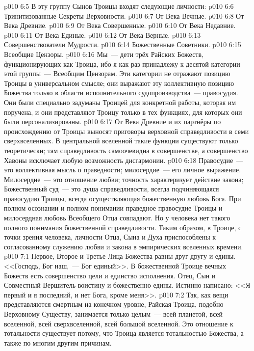\vs p010 6:5 \pc В эту группу Сынов Троицы входят следующие личности:
\vs p010 6:6 Тринитизованные Секреты Верховности.
\vs p010 6:7 От Века Вечные.
\vs p010 6:8 От Века Древние.
\vs p010 6:9 От Века Совершенные.
\vs p010 6:10 От Века Недавние.
\vs p010 6:11 От Века Единые.
\vs p010 6:12 От Века Верные.
\vs p010 6:13 Совершенствователи Мудрости.
\vs p010 6:14 Божественные Советники.
\vs p010 6:15 Всеобщие Цензоры.
\vs p010 6:16 \pc Мы~--- дети трёх Райских Божеств, функционирующих как Троица, ибо я как раз принадлежу к десятой категории этой группы~--- Всеобщим Цензорам. Эти категории не отражают позицию Троицы в универсальном смысле; они выражают эту коллективную позицию Божества только в области исполнительного судопроизводства~--- правосудия. Они были специально задуманы Троицей для конкретной работы, которая им поручена, и они представляют Троицу только в тех функциях, для которых они были персонализированы.
\vs p010 6:17 От Века Древние и их партнёры по происхождению от Троицы выносят приговоры верховной справедливости в семи сверхвселенных. В центральной вселенной такие функции существуют только теоретически; там справедливость самоочевидна в совершенстве, а совершенство Хавоны исключает любую возможность дисгармонии.
\vs p010 6:18 Правосудие~--- это коллективная мысль о праведности; милосердие~--- его личное выражение. Милосердие~--- это отношение любви; точность характеризует действие закона; Божественный суд~--- это душа справедливости, всегда подчиняющаяся правосудию Троицы, всегда осуществляющая божественную любовь Бога. При полном осознании и полном понимании праведное правосудие Троицы и милосердная любовь Всеобщего Отца совпадают. Но у человека нет такого полного понимания божественной справедливости. Таким образом, в Троице, с точки зрения человека, личности Отца, Сына и Духа приспособлены к согласованному служению любви и закона в эмпирических вселенных времени.
\vs p010 7:1 Первое, Второе и Третье Лица Божества равны друг другу и едины. <<Господь, Бог наш,~--- Бог единый>>. В божественной Троице вечных Божеств есть совершенство цели и единство исполнения. Отец, Сын и Совместный Вершитель воистину и божественно едины. Истинно написано: <<Я первый и я последний, и нет Бога, кроме меня>>.
\vs p010 7:2 \pc Так, как вещи представляются смертным на конечном уровне, Райская Троица, подобно Верховному Существу, занимается только целым~--- всей планетой, всей вселенной, всей сверхвселенной, всей большой вселенной. Это отношение к тотальности существует потому, что Троица является тотальностью Божества, а также по многим другим причинам.
